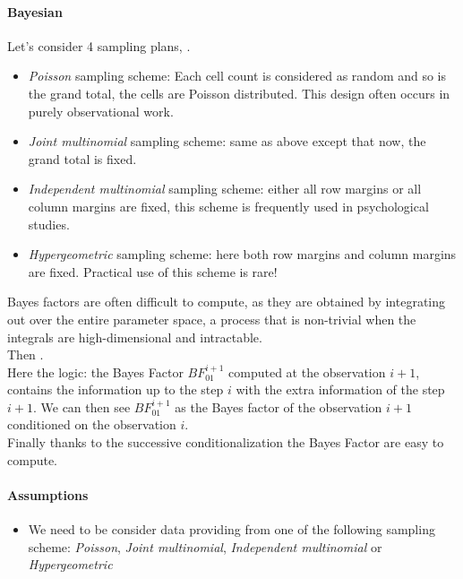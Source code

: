 \paragraph{Bayesian}
Let's consider 4 sampling plans, .
\begin{itemize}
    \item \emph{Poisson} sampling scheme: Each cell count is considered as random and so
        is the grand total, the cells are Poisson distributed. This design often occurs
        in purely observational work.
    \item \emph{Joint multinomial} sampling scheme: same as above except that now, the 
        grand total is fixed. 
    \item \emph{Independent multinomial} sampling scheme: either all row margins or all 
        column margins are fixed, this scheme is frequently used in psychological studies.
    \item \emph{Hypergeometric} sampling scheme: here both row margins and column margins are fixed. Practical use of this scheme is rare!  
\end{itemize}
Bayes factors are often difficult to compute, as they are obtained by integrating out over
the entire parameter space, a process that is non-trivial when the integrals are 
high-dimensional and intractable. \\
Then .\\
Here the logic: the Bayes Factor $BF^{i+1}_{01}$ computed at the observation $i+1$, 
contains the information up to the step $i$ with the extra information of the step $i+1$. 
We can then see $BF^{i+1}_{01}$ as the Bayes factor of the observation $i+1$ conditioned
on the observation $i$.\\
Finally thanks to the successive conditionalization the Bayes Factor are easy to compute.

\paragraph{Assumptions}
\begin{itemize}
    \item We need to be consider data providing from one of the following sampling scheme: \emph{Poisson}, \emph{Joint multinomial}, \emph{Independent multinomial} or 
        \emph{Hypergeometric}
\end{itemize}

